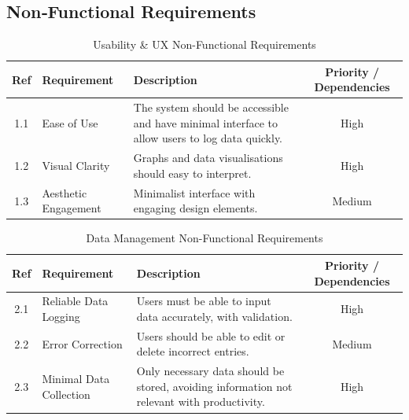 \documentclass[12pt,a4paper]{article}
\begin{document}
\subsection{Non‑Functional Requirements}
\begin{table}[h]
    \centering

    \renewcommand{\arraystretch}{1.3} %
    \begin{tabular}{|c|l|p{6.5cm}|c|} %
        \hline
        \textbf{Ref} & \textbf{Requirement} & \textbf{Description} & \textbf{Priority / Dependencies} \\
        \hline
        1.1 & Ease of Use & The system should be accessible and have minimal interface to allow users to log data quickly. & High \\
        \hline
        1.2 & Visual Clarity & Graphs and data visualisations should  easy to interpret. & High \\
        \hline
        1.3 & Aesthetic Engagement & Minimalist interface with engaging design elements. & Medium \\
        \hline
    \end{tabular}
    \caption{Usability \& UX Non-Functional Requirements}
    \label{tab:usability_ux}
\end{table}

\begin{table}[h]
    \centering

    \renewcommand{\arraystretch}{1.3} %
    \begin{tabular}{|c|l|p{6.1cm}|c|} %
        \hline
        \textbf{Ref} & \textbf{Requirement} & \textbf{Description} & \textbf{Priority / Dependencies} \\
        \hline
        2.1 & Reliable Data Logging & Users must be able to input data accurately, with validation. & High \\
        \hline
        2.2 & Error Correction & Users should be able to edit or delete incorrect entries. & Medium \\
        \hline
        2.3 & Minimal Data Collection & Only necessary data should be stored, avoiding information not relevant with productivity. & High \\
        \hline
    \end{tabular}
    \caption{Data Management Non-Functional Requirements}
    \label{tab:data_management}
\end{table}
\end{document}
